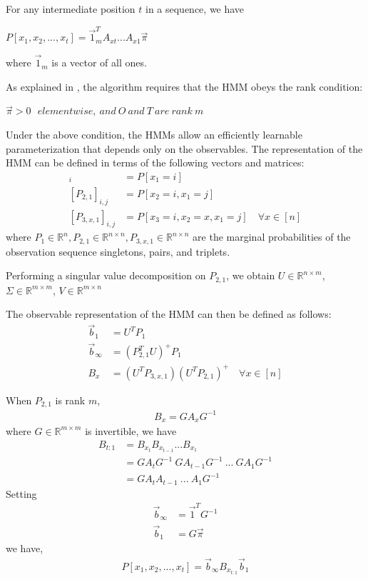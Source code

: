 \documentclass[letterpaper]{article}
\begin{document}
For any intermediate position $t$ in a sequence, we have

\begin{center}
	$P[x_{1}, x_{2}, ..., x_{t}] = \vec1_{m}^{T}A_{xt}...A_{x1}\vec\pi$
\end{center}
where $\vec1_{m}$ is a vector of all ones.

As explained in \cite{semen paper}, the algorithm requires that the HMM obeys the rank condition:
\begin{center}
	$\vec\pi > 0\ \ \ element wise,\ and\ O\ and\ T\ are\ rank\ m$
\end{center}
Under the above condition, the HMMs allow an efficiently learnable parameterization that depends only on the observables. The representation of the HMM can be defined in terms of the following vectors and matrices:
\begin{align*}
	[P_{1}]_{i}       & = P[x_{1} = i]                                         \\
	[P_{2,1}]_{i,j}   & = P[x_{2}=i, x_{1}=j]                                  \\
	[P_{3,x,1}]_{i,j} & = P[x_{3}=i, x_{2}=x, x_{1}=j] \quad \forall x \in [n] 
\end{align*}
where $P_{1} \in \mathbb{R}^{n}, P_{2,1} \in \mathbb{R}^{n \times n}, P_{3,x,1} \in \mathbb{R}^{n \times n}$ are the marginal probabilities of the observation sequence singletons, pairs, and triplets.

Performing a singular value decomposition on $P_{2,1}$, we obtain $U \in \mathbb{R}^{n \times m}$, $\Sigma \in \mathbb{R}^{m \times m}$, $V \in \mathbb{R}^{m \times n}$

The observable representation of the HMM can then be defined as follows:
\begin{align*}
	\vec b_{1}      & = U^{T}P_{1}                                                 \\
	\vec b_{\infty} & = (P_{2,1}^{T}U)^{+}P_{1}                                    \\
	B_{x}           & = (U^{T}P_{3,x,1})(U^{T}P_{2,1})^{+} \quad \forall x \in [n] 
\end{align*}

When $P_{2,1}$ is rank $m$, 
\begin{align*}
B_{x} = GA_{x}G^{-1}
\end{align*}
where $G \in \mathbb{R}^{m \times m}$ is invertible, we have
\begin{align*}
B_{t:1} & = B_{x_{t}}B_{x_{t-1}}...B_{x_{1}} \\
			 & = GA_{t}G^{-1}\ GA_{t-1}G^{-1}\ ...\ GA_{1}G^{-1} \\
			 & = GA_{t}A_{t-1}\ ...\ A_{1}G^{-1}
\end{align*}
Setting 
\begin{align*}
\vec b_{\infty} & = \vec 1^{T}G^{-1} \\
\vec b_{1}      & = G\vec \pi 
\end{align*}
we have,
\begin{align*}
P[x_{1}, x_{2}, ..., x_{t}]  = \vec b_{\infty}B_{x_{t:1}} \vec b_{1} 
\end{align*}
\end{document}
